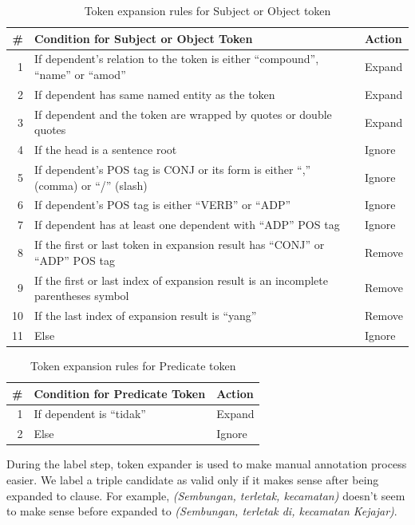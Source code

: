 \begin{table}[!t]
\renewcommand{\arraystretch}{1.5}
\caption{Token expansion rules for Subject or Object token}
\label{tab:token_expansion_rules_s_o}
\centering
\begin{tabular}{r p{6cm} l}
\hline
\textbf{\#} & \textbf{Condition for Subject or Object Token} & \textbf{Action} \\
\hline
1 & If dependent's relation to the token  is either “compound”, “name”  or “amod” & Expand \\
2 & If dependent has same named entity as the token & Expand \\
3 & If dependent and the token are wrapped by quotes or double quotes  & Expand \\
4 & If the head is a sentence root & Ignore \\
5 & If dependent's POS tag is CONJ or its form is either “,” (comma) or “/” (slash) & Ignore \\
6 & If dependent's POS tag is either “VERB” or “ADP” & Ignore \\
7 & If dependent has at least one dependent with “ADP” POS tag & Ignore \\
8 & If the first or last token in expansion result has “CONJ” or “ADP” POS tag & Remove \\
9 & If the first or last index of expansion result is an incomplete parentheses symbol & Remove \\
10 & If the last index of expansion result is “yang” & Remove \\
11 & Else & Ignore \\
\hline
\end{tabular}
\end{table}

\begin{table}[!t]
\renewcommand{\arraystretch}{1.5}
\caption{Token expansion rules for Predicate token}
\label{tab:token_expansion_rules_p}
\centering
\begin{tabular}{r p{6cm} l}
\hline
\textbf{\#} & \textbf{Condition for Predicate Token} & \textbf{Action} \\
\hline
1 & If dependent is “tidak” & Expand \\
2 & Else & Ignore \\
\hline
\end{tabular}
\end{table}

During the label step, token expander is used to make manual annotation process easier. We label a triple candidate as valid only if it makes sense after being expanded to clause. For example, \textit{(Sembungan, terletak, kecamatan)} doesn't seem to make sense before expanded to \textit{(Sembungan, terletak di, kecamatan Kejajar)}.


